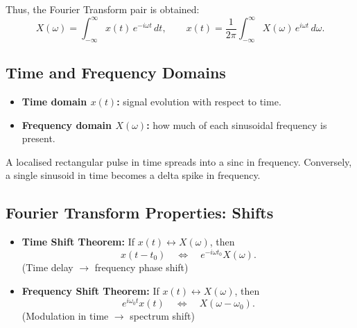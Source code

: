 \documentclass[a4paper,12pt]{article}
\begin{document}
Thus, the Fourier Transform pair is obtained:
\[
X(\omega) = \int_{-\infty}^{\infty} x(t)\, e^{-i \omega t}\,dt, 
\qquad
x(t) = \frac{1}{2\pi} \int_{-\infty}^{\infty} X(\omega)\, e^{i \omega t}\,d\omega.
\]

\subsection{Time and Frequency Domains}

\begin{itemize}
    \item \textbf{Time domain $x(t)$:} signal evolution with respect to time.
    \item \textbf{Frequency domain $X(\omega)$:} how much of each sinusoidal frequency is present.
\end{itemize}

\begin{center}
\end{center}

A localised rectangular pulse in time spreads into a sinc in frequency. Conversely, a single sinusoid in time becomes a delta spike in frequency.

\subsection{Fourier Transform Properties: Shifts}

\begin{itemize}
    \item \textbf{Time Shift Theorem:}  
    If $x(t) \leftrightarrow X(\omega)$, then
    \[
    x(t-t_0) \quad \Longleftrightarrow \quad e^{-i \omega t_0} X(\omega).
    \]
    (Time delay $\to$ frequency phase shift)

    \item \textbf{Frequency Shift Theorem:}  
    If $x(t) \leftrightarrow X(\omega)$, then
    \[
    e^{i \omega_0 t} x(t) \quad \Longleftrightarrow \quad X(\omega - \omega_0).
    \]
    (Modulation in time $\to$ spectrum shift)
\end{itemize}
\end{document}
